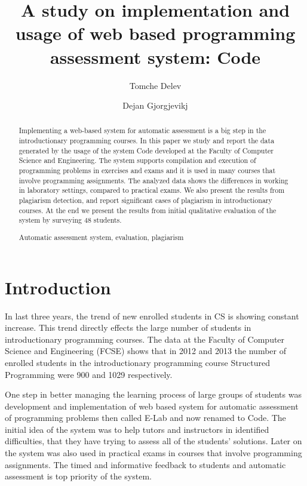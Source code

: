 \documentclass{llncs}
\newcommand{\keywords}[1]{\par\addvspace\baselineskip
\noindent\keywordname\enspace\ignorespaces#1}
\begin{document}
\title{A study on implementation and usage of web based programming assessment
system: Code}

\author{Tomche Delev \and Dejan Gjorgjevikj}



\maketitle


\begin{abstract}
Implementing a web-based system for automatic assessment is a big step in the
introductionary programming courses. In this paper we study and report the
data generated by the usage of the system Code developed at the Faculty of
Computer Science and Engineering. The system supports compilation and execution
of programming problems in exercises and exams and it is used in many courses
that involve programming assignments. The analyzed data shows the differences in
working in laboratory settings, compared to practical exams. We also present the
results from plagiarism detection, and report significant cases of plagiarism in
introductionary courses. At the end we present the results from initial
qualitative evaluation of the system by surveying 48 students.

\keywords{Automatic assessment system, evaluation, plagiarism}
\end{abstract}

\section{Introduction}

In last three years, the trend of new enrolled students in CS is showing
constant increase. This trend directly effects the large number of students in
introductionary programming courses. The data at the Faculty of Computer Science
and Engineering (FCSE) shows that in 2012 and 2013 the number of enrolled
students in the introductionary programming course Structured Programming were 900 and
1029 respectively.

One step in better managing the learning process of large groups of students
was development and implementation of web based system for automatic assessment of programming
problems then called E-Lab \cite{delev2012lab} and now renamed to Code. The
initial idea of the system was to help tutors and instructors in identified
difficulties, that they have trying to assess all of the students' solutions.
Later on the system was also used in practical exams in courses that involve
programming assignments. The timed and informative feedback to students and
automatic assessment is top priority of the system.
\end{document}
